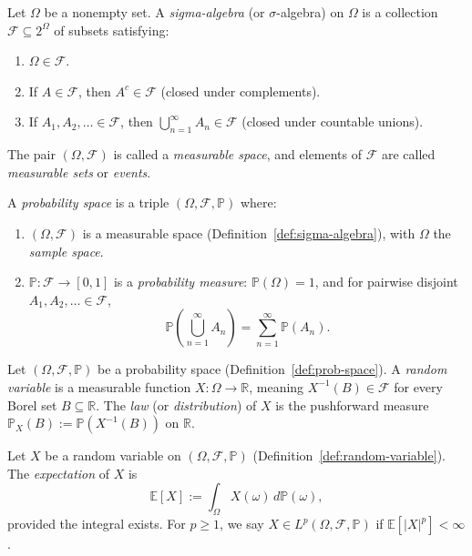 
\begin{definition}
\label{def:sigma-algebra}
Let $\Omega$ be a nonempty set. A \emph{sigma-algebra} (or $\sigma$-algebra) on $\Omega$ is a collection $\mathcal{F} \subseteq 2^\Omega$ of subsets satisfying:
\begin{enumerate}
  \item $\Omega \in \mathcal{F}$.
  \item If $A \in \mathcal{F}$, then $A^c \in \mathcal{F}$ (closed under complements).
  \item If $A_1, A_2, \ldots \in \mathcal{F}$, then $\bigcup_{n=1}^\infty A_n \in \mathcal{F}$ (closed under countable unions).
\end{enumerate}
The pair $(\Omega, \mathcal{F})$ is called a \emph{measurable space}, and elements of $\mathcal{F}$ are called \emph{measurable sets} or \emph{events}.
\end{definition}

\begin{definition}
\label{def:prob-space}
A \emph{probability space} is a triple $(\Omega, \mathcal{F}, \mathbb{P})$ where:
\begin{enumerate}
  \item $(\Omega, \mathcal{F})$ is a measurable space (Definition~\ref{def:sigma-algebra}), with $\Omega$ the \emph{sample space}.
  \item $\mathbb{P} : \mathcal{F} \to [0,1]$ is a \emph{probability measure}: $\mathbb{P}(\Omega) = 1$, and for pairwise disjoint $A_1, A_2, \ldots \in \mathcal{F}$,
  \[
    \mathbb{P}\!\left(\bigcup_{n=1}^\infty A_n\right) = \sum_{n=1}^\infty \mathbb{P}(A_n).
  \]
\end{enumerate}
\end{definition}

\begin{definition}
\label{def:random-variable}
Let $(\Omega, \mathcal{F}, \mathbb{P})$ be a probability space (Definition~\ref{def:prob-space}).
A \emph{random variable} is a measurable function $X : \Omega \to \mathbb{R}$, meaning $X^{-1}(B) \in \mathcal{F}$ for every Borel set $B \subseteq \mathbb{R}$.
The \emph{law} (or \emph{distribution}) of $X$ is the pushforward measure $\mathbb{P}_X(B) := \mathbb{P}(X^{-1}(B))$ on $\mathbb{R}$.
\end{definition}

\begin{definition}[Expectation]
\label{def:expectation}
Let $X$ be a random variable on $(\Omega, \mathcal{F}, \mathbb{P})$ (Definition~\ref{def:random-variable}).
The \emph{expectation} of $X$ is
\[
  \mathbb{E}[X] := \int_\Omega X(\omega)\, d\mathbb{P}(\omega),
\]
provided the integral exists. For $p \geq 1$, we say $X \in L^p(\Omega, \mathcal{F}, \mathbb{P})$ if $\mathbb{E}[|X|^p] < \infty$.
\end{definition}

